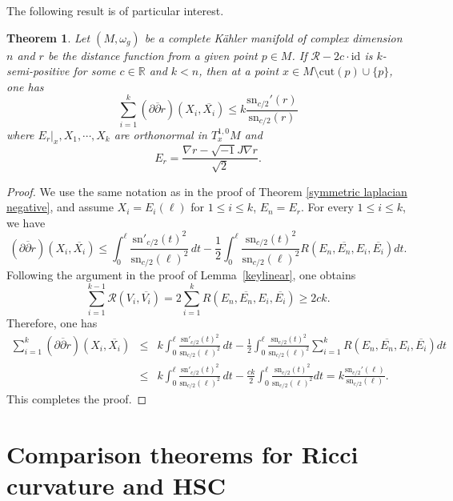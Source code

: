 \documentclass[12pt,reqno]{amsart}
\newcommand\sR{{\mathcal R}}
\newcommand\bp{{\bar\partial}}
\theoremstyle{plain}
\newtheorem{thm}{Theorem}[section]
\theoremstyle{definition}
\newcommand{\btheorem}{\begin{thm}}
\newcommand{\etheorem}{\end{thm}}
\newcommand{\bproof}{\begin{proof}}
\newcommand{\eproof}{\end{proof}}
\newcommand{\sq}{\sqrt{-1}}
\newcommand{\p}{\partial}
\renewcommand{\bar}{\overline}
\newcommand{\beq}{\begin{equation}}
\newcommand{\eeq}{\end{equation}}
\renewcommand{\bp}{\bar{\partial}}
\renewcommand{\>}{\rightarrow}
\newcommand{\R}{{\mathbb R}}
\numberwithin{equation}{section} %
\newcommand{\om}{\omega}
\renewcommand{\leq}{\leqslant}
\renewcommand{\geq}{\geqslant}
\begin{document}
\noindent The following result is of particular interest. \btheorem
Let $(M,\om_g)$ be a complete K\"ahler manifold of complex dimension
$n$ and $r$ be the distance function from a given point $p\in M$. If
$\sR-2c\cdot \mathrm{id}$ is $k$-semi-positive for some $c\in\R$ and $k<n$, then at
a point $x\in M\setminus \mathrm{cut}(p)\cup\{p\}$, one has \beq
    \sum_{i=1}^k\left(\p\bp r\right)\left(X_i,\bar{X_i}\right)\leq
    k\frac{\mathrm{sn}_{c/2}'(r)}{\mathrm{sn}_{c/2}(r)}
    \label{khessiancomparison}
\eeq
where $E_r|_x,X_1,\cdots,X_{k}$ are orthonormal in $T_x^{1,0}M$ and
$$E_r=\frac{\nabla r-\sq J\nabla r}{\sqrt{2}}.$$
\etheorem

\bproof
    We use the same notation as in the proof of Theorem \ref{symmetric laplacian negative}, and assume $X_i=E_i(\ell)$ for $1\leq i\leq k$, $E_n=E_r$. For every $1\leq i\leq k$, we  have
    \beq
        \left(\p\bp r\right)\left(X_i,\bar{X_i}\right)
        \leq \int_0^\ell  \frac{\mathrm{sn}'_{c/2}(t)^2}{\mathrm{sn}_{c/2}(\ell)^2}\,dt
        -\frac{1}{2}\int_0^\ell \frac{\mathrm{sn}_{c/2}(t)^2}{\mathrm{sn}_{c/2}(\ell)^2}R\left(E_n,\bar{E_n},E_i,\bar{E_i}\right) dt.
    \eeq
    Following the argument in the proof of Lemma~\ref{keylinear}, one obtains
    \beq
    \sum_{i=1}^{k-1} \sR\left(V_i,\bar{V_i}\right)=2    \sum_{i=1}^k R\left(E_n,\bar{E_n},E_i,\bar{E_i}\right)\geq 2ck.
    \eeq
    Therefore, one has
    \begin{eqnarray}
        \sum_{i=1}^k\left(\p\bp r\right)\left(X_i,\bar{X_i}\right)
        &\leq& k\int_0^\ell  \frac{\mathrm{sn}'_{c/2}(t)^2}{\mathrm{sn}_{c/2}(\ell)^2}\,dt
        -\frac{1}{2}\int_0^\ell \frac{\mathrm{sn}_{c/2}(t)^2}{\mathrm{sn}_{c/2}(\ell)^2} \sum_{i=1}^k R\left(E_n,\bar{E_n},E_i,\bar{E_i}\right) dt\nonumber\\
        &\leq& k\int_0^\ell  \frac{\mathrm{sn}'_{c/2}(t)^2}{\mathrm{sn}_{c/2}(\ell)^2}\,dt
        -\frac{ck}{2}\int_0^\ell \frac{\mathrm{sn}_{c/2}(t)^2}{\mathrm{sn}_{c/2}(\ell)^2} dt
        = k\frac{\mathrm{sn}_{c/2}'(\ell)}{\mathrm{sn}_{c/2}(\ell)}.
    \end{eqnarray}
    This completes the proof.
\eproof









\baselineskip

\section{Comparison theorems for Ricci curvature and HSC}
\end{document}
